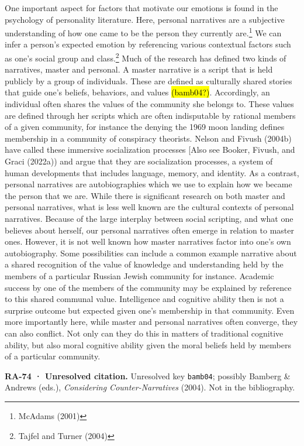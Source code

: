 \documentclass[
  letterpaper,
  DIV=11,
  numbers=noendperiod]{scrartcl}
\theoremstyle{remark}
\begin{document}
One important aspect for factors that motivate our emotions is found in
the psychology of personality literature. Here, personal narratives are
a subjective understanding of how one came to be the person they
currently are.\footnote{McAdams (2001)} We can infer a person's expected
emotion by referencing various contextual factors such as one's social
group and class.\footnote{Tajfel and Turner (2004)} Much of the research
has defined two kinds of narratives, master and personal. A master
narrative is a script that is held publicly by a group of individuals.
These are defined as culturally shared stories that guide one's beliefs,
behaviors, and values \hl{(bamb04?)}. Accordingly, an individual often
shares the values of the community she belongs to. These values are
defined through her scripts which are often indisputable by rational
members of a given community, for instance the denying the 1969 moon
landing defines membership in a community of conspiracy theorists.
Nelson and Fivush (2004b) have called these immersive socialization
processes {[}Also see Booker, Fivush, and Graci (2022a)) and argue that
they are socialization processes, a system of human developments that
includes language, memory, and identity. As a contrast, personal
narratives are autobiographies which we use to explain how we became the
person that we are. While there is significant research on both master
and personal narratives, what is less well known are the cultural
contexts of personal narratives. Because of the large interplay between
social scripting, and what one believes about herself, our personal
narratives often emerge in relation to master ones. However, it is not
well known how master narratives factor into one's own autobiography.
Some possibilities can include a common example narrative about a shared
recognition of the value of knowledge and understanding held by the
members of a particular Russian Jewish community for instance. Academic
success by one of the members of the community may be explained by
reference to this shared communal value. Intelligence and cognitive
ability then is not a surprise outcome but expected given one's
membership in that community. Even more importantly here, while master
and personal narratives often converge, they can also conflict. Not only
can they do this in matters of traditional cognitive ability, but also
moral cognitive ability given the moral beliefs held by members of a
particular community.

\begin{tcolorbox}[enhanced jigsaw, arc=.35mm, bottomrule=.15mm, bottomtitle=1mm, breakable, colback=white, colbacktitle=quarto-callout-warning-color!10!white, colframe=quarto-callout-warning-color-frame, coltitle=black, left=2mm, leftrule=.75mm, opacityback=0, opacitybacktitle=0.6, rightrule=.15mm, title=\textcolor{quarto-callout-warning-color}{\faExclamationTriangle}\hspace{0.5em}{Warning}, titlerule=0mm, toprule=.15mm, toptitle=1mm]

\textbf{RA-74 · Unresolved citation.} Unresolved key \texttt{bamb04};
possibly Bamberg \& Andrews (eds.), \emph{Considering
Counter-Narratives} (2004). Not in the bibliography.

\end{tcolorbox}
\end{document}
